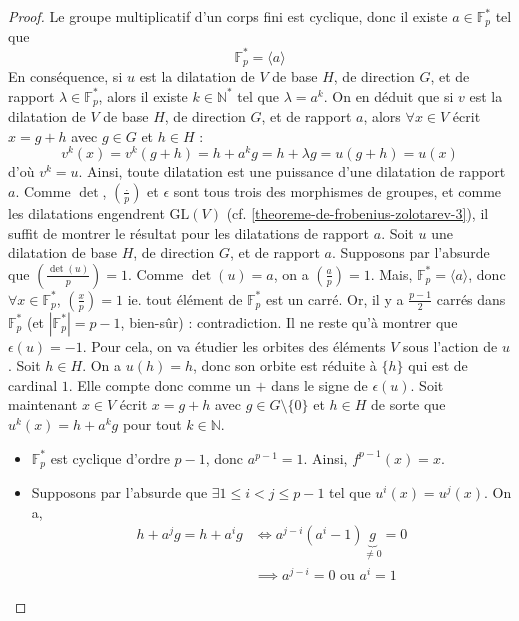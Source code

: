   \begin{proof}
    Le groupe multiplicatif d'un corps fini est cyclique, donc il existe $a \in \mathbb{F}_p^*$ tel que
    \[ \mathbb{F}_p^* = \langle a \rangle \]
    En conséquence, si $u$ est la dilatation de $V$ de base $H$, de direction $G$, et de rapport $\lambda \in \mathbb{F}_p^*$, alors il existe $k \in \mathbb{N}^*$ tel que $\lambda = a^k$. On en déduit que si $v$ est la dilatation de $V$ de base $H$, de direction $G$, et de rapport $a$, alors $\forall x \in V$ écrit $x = g + h$ avec $g \in G$ et $h \in H$ :
    \[ v^k(x) = v^k(g+h) = h + a^k g = h + \lambda g = u(g+h) = u(x) \]
    d'où $v^k = u$. Ainsi, toute dilatation est une puissance d'une dilatation de rapport $a$.
    \newpar
    Comme $\det$, $\left( \frac{.}{p} \right)$ et $\epsilon$ sont tous trois des morphismes de groupes, et comme les dilatations engendrent $\mathrm{GL}(V)$ (cf. \cref{theoreme-de-frobenius-zolotarev-3}), il suffit de montrer le résultat pour les dilatations de rapport $a$.
    \newpar
    Soit $u$ une dilatation de base $H$, de direction $G$, et de rapport $a$. Supposons par l'absurde que $\left( \frac{\det(u)}{p} \right) = 1$. Comme $\det(u) = a$, on a $\left( \frac{a}{p} \right) = 1$. Mais, $\mathbb{F}_p^* = \langle a \rangle$, donc $\forall x \in \mathbb{F}_p^*$, $\left( \frac{x}{p} \right) = 1$ ie. tout élément de $\mathbb{F}_p^*$ est un carré. Or, il y a $\frac{p-1}{2}$ carrés dans $\mathbb{F}_p^*$ (et $|\mathbb{F}_p^*| = p-1$, bien-sûr) : contradiction.
    \newpar
    Il ne reste qu'à montrer que $\epsilon(u) = -1$. Pour cela, on va étudier les orbites des éléments $V$ sous l'action de $u$.
    \newpar
    Soit $h \in H$. On a $u(h) = h$, donc son orbite est réduite à $\{ h \}$ qui est de cardinal $1$. Elle compte donc comme un $+$ dans le signe de $\epsilon(u)$.
    \newpar
    Soit maintenant $x \in V$ écrit $x = g + h$ avec $g \in G \setminus \{ 0 \}$ et $h \in H$ de sorte que $u^k (x) = h + a^k g$ pour tout $k \in \mathbb{N}$.
    \begin{itemize}
      \item $\mathbb{F}_p^*$ est cyclique d'ordre $p-1$, donc $a^{p-1} = 1$. Ainsi, $f^{p-1} (x) = x$.
      \item Supposons par l'absurde que $\exists 1 \leq i < j \leq p-1$ tel que $u^i(x) = u^j(x)$. On a,
      \begin{align*}
        h + a^j g = h + a^i g &\iff a^{j-i} (a^i - 1) \underbrace{g}_{\neq 0} = 0 \\
        &\implies a^{j-i} = 0 \text{ ou } a^i = 1
      \end{align*}

\end{itemize}
\end{proof}
